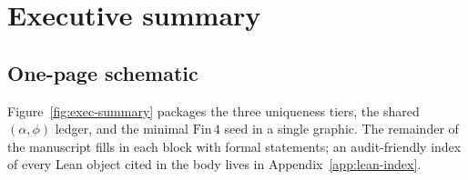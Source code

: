 \documentclass[11pt]{amsart}
\begin{document}


\section{Executive summary}
\label{sec:executive}

\subsection{One-page schematic}
\label{subsec:exec-diagram}

Figure~\ref{fig:exec-summary} packages the three uniqueness tiers, the shared \((\alpha,\phi)\) ledger, and the minimal \(\mathrm{Fin}\,4\) seed in a single graphic. The remainder of the manuscript fills in each block with formal statements; an audit-friendly index of every Lean object cited in the body lives in Appendix~\ref{app:lean-index}.
\end{document}
